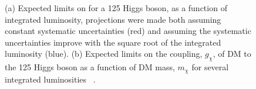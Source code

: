 \begin{figure}

  \caption[(a) Expected limits on \BRinv for a 125 \GeV Higgs boson, as a function of integrated luminosity, projections were made both assuming constant systematic uncertainties (red) and assuming the systematic uncertainties improve with the square root of the integrated luminosity (blue). (b) Expected limits on the coupling, $g_{\chi}$, of DM to the 125 \GeV Higgs boson as a function of DM mass, $m_{\chi}$ for several integrated luminosities.]{(a) Expected limits on \BRinv for a 125 \GeV Higgs boson, as a function of integrated luminosity, projections were made both assuming constant systematic uncertainties (red) and assuming the systematic uncertainties improve with the square root of the integrated luminosity (blue). (b) Expected limits on the coupling, $g_{\chi}$, of DM to the 125 \GeV Higgs boson as a function of DM mass, $m_{\chi}$ for several integrated luminosities ~\cite{ourdmpaper}.}
  \label{fig:smprojectedlimits}
\end{figure}

